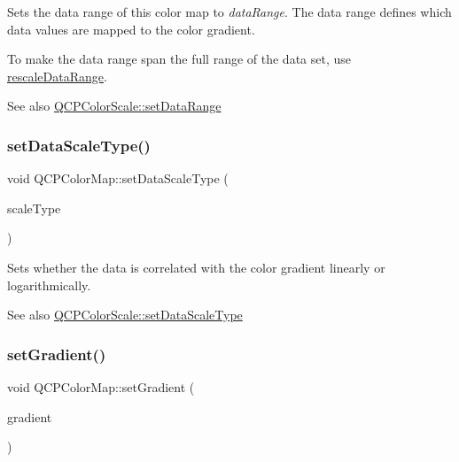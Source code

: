 Sets the data range of this color map to {\itshape data\+Range}. The data range defines which data values are mapped to the color gradient.

To make the data range span the full range of the data set, use \hyperlink{classQCPColorMap_a856608fa3dd1cc290bcd5f29a5575774}{rescale\+Data\+Range}.

\begin{DoxySeeAlso}{See also}
\hyperlink{classQCPColorScale_abe88633003a26d1e756aa74984587fef}{Q\+C\+P\+Color\+Scale\+::set\+Data\+Range} 
\end{DoxySeeAlso}
\mbox{\label{classQCPColorMap_a9d20aa08e3c1f20f22908c45b9c06511}} 
\subsubsection{\texorpdfstring{set\+Data\+Scale\+Type()}{setDataScaleType()}}
{\footnotesize\ttfamily void Q\+C\+P\+Color\+Map\+::set\+Data\+Scale\+Type (\begin{DoxyParamCaption}\item[{\hyperlink{classQCPAxis_a36d8e8658dbaa179bf2aeb973db2d6f0}{Q\+C\+P\+Axis\+::\+Scale\+Type}}]{scale\+Type }\end{DoxyParamCaption})}

Sets whether the data is correlated with the color gradient linearly or logarithmically.

\begin{DoxySeeAlso}{See also}
\hyperlink{classQCPColorScale_aeb6107d67dd7325145b2498abae67fc3}{Q\+C\+P\+Color\+Scale\+::set\+Data\+Scale\+Type} 
\end{DoxySeeAlso}
\mbox{\label{classQCPColorMap_a7313c78360471cead3576341a2c50377}} 
\subsubsection{\texorpdfstring{set\+Gradient()}{setGradient()}}
{\footnotesize\ttfamily void Q\+C\+P\+Color\+Map\+::set\+Gradient (\begin{DoxyParamCaption}\item[{const \hyperlink{classQCPColorGradient}{Q\+C\+P\+Color\+Gradient} \&}]{gradient }\end{DoxyParamCaption})}

